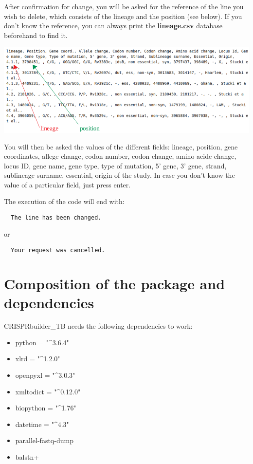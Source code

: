 \documentclass[twoside,a4paper,11pt,frenchb,openany]{report}
\begin{document}
After confirmation for change, you will be asked for the reference of
the line you wish to delete, which consists of the lineage and the
position (see below). If you don't know the reference, you can always
print the \textbf{lineage.csv} database beforehand to find it.

\includegraphics[width=16cm]{selection.png}

    You will then be asked the values of the different fields: lineage,
position, gene coordinates, allege change, codon number, codon change,
amino acide change, locus ID, gene name, gene type, type of mutation, 5'
gene, 3' gene, strand, sublineage surname, essential, origin of the
study. In case you don't know the value of a particular field, just
press enter.

    The execution of the code will end with:

    \begin{verbatim}
  The line has been changed.
\end{verbatim}

    or

    \begin{verbatim}
  Your request was cancelled.
\end{verbatim}


    \section{Composition of the package and
dependencies}\label{composition-of-the-package-and-dependencies}

    CRISPRbuilder\_TB needs the following dependencies to work:

\begin{itemize}
\item
  python = "\^{}3.6.4"
\item
  xlrd = "\^{}1.2.0"
\item
  openpyxl = "\^{}3.0.3"
\item
  xmltodict = "\^{}0.12.0"
\item
  biopython = "\^{}1.76"
\item
  datetime = "\^{}4.3"
\item
  parallel-fastq-dump
\item
  balstn+
\end{itemize}
\end{document}
